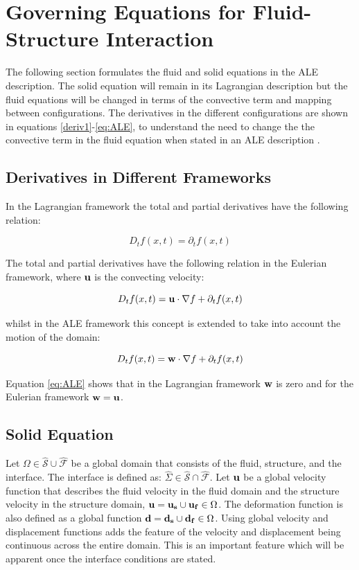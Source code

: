 \section{Governing Equations for Fluid-Structure Interaction}

The following section formulates the fluid and solid equations in the ALE description. The solid equation will remain in its Lagrangian description but the fluid equations will be changed in terms of the convective term and mapping between configurations. The derivatives in the different configurations are shown in equations \ref{deriv1}-\ref{eq:ALE}, to understand the need to change the the convective term in the fluid equation when stated in an ALE description \cite{Wick2011}.

\subsection{Derivatives in Different Frameworks}

In the Lagrangian framework the total and partial derivatives have the following relation:

\begin{equation}
D_t f(x,t) = \partial_t f(x,t) 
\label{deriv1}
\end{equation}

The total and partial derivatives have the following relation in the Eulerian framework, where $\bold{u}$ is the convecting velocity:

\begin{equation}
D_t f(x,t) = \bold{u}\cdot \nabla{f} + \partial_t f(x,t)
\label{deriv2}
\end{equation}

whilst in the ALE framework this concept is extended to take into account the motion of the domain:

\begin{equation}\label{eq:ALE}
D_t f(x,t) = \bold{w} \cdot\nabla{f} + \partial_t f(x,t)
\end{equation}

Equation \ref{eq:ALE} shows that in the Lagrangian framework $ \bold{w}$ is zero and for the Eulerian framework $\bold{w} = \bold{u}$.

\subsection{Solid Equation}
Let $\Omega \in \hat{\mathcal{S}} \cup \hat{\mathcal{F}} $ be a global domain that consists of the fluid, structure, and the interface. The interface is defined as: $ \hat{\Sigma} \in \hat{\mathcal{S}} \cap \hat{\mathcal{F}}  $. Let $\bold{u}$ be a global velocity function that describes the fluid velocity in the fluid domain and the structure velocity in the structure domain, $\bold{u} = \bold{u_s} \cup \bold{u_f} \in \Omega$. The deformation function is also defined as a global function $\bold{d} = \bold{d_s} \cup \bold{d_f} \in \Omega$. Using global velocity and displacement functions adds the feature of the velocity and displacement being continuous across the entire domain. This is an important feature which will be apparent once the interface conditions are stated. \newline 

